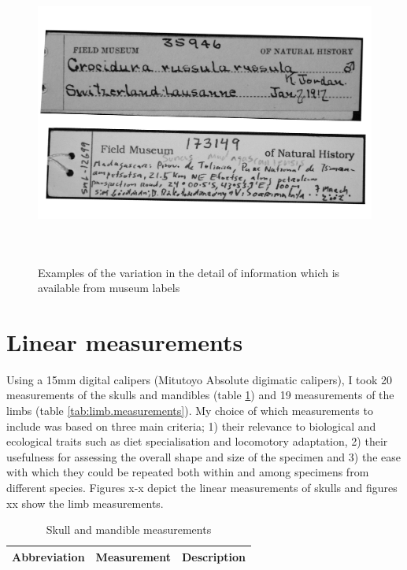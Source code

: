 \begin{figure} 
  \centering
  \includegraphics[width = 30cm, height = 10cm, keepaspectratio=true]{Methods/figures/labels.png}
    \caption[Examples of museum labels]%
    {Examples of the variation in the detail of information which is available from museum labels}%
  \label{fig:museum.labels}
  \end{figure}
  
\section{Linear measurements}

Using a 15mm digital calipers (Mitutoyo Absolute digimatic calipers), I took 20 measurements of the skulls and mandibles (table \ref{tab:sk.measurements}) and 19 measurements of the limbs (table \ref{tab:limb.measurements}). My choice of which measurements to include was based on three main criteria; 1) their relevance to biological and ecological traits such as diet specialisation and locomotory adaptation, 2) their usefulness for assessing the overall shape and size of the specimen and 3) the ease with which they could be repeated both within and among specimens from different species. 
Figures x-x depict the linear measurements of skulls and figures xx show the limb measurements.

\begin{table}[h]
\caption[Description of the skull and mandible measurements]
		{Skull and mandible measurements}%
\begin{tabular}{lll}
\hline
\textbf{Abbreviation} & \textbf{Measurement} & \textbf{Description}\\
\hline
\hline
\end{tabular}
\label{tab:sk.measurements}
\end{table}

